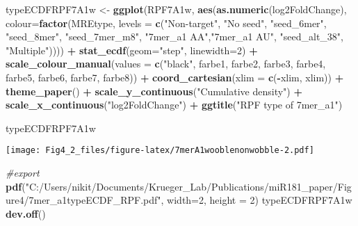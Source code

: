 \documentclass[
]{article}
\newenvironment{Shaded}{\begin{snugshade}}{\end{snugshade}}
\newcommand{\AttributeTok}[1]{\textcolor[rgb]{0.13,0.29,0.53}{#1}}
\newcommand{\CommentTok}[1]{\textcolor[rgb]{0.56,0.35,0.01}{\textit{#1}}}
\newcommand{\DecValTok}[1]{\textcolor[rgb]{0.00,0.00,0.81}{#1}}
\newcommand{\FunctionTok}[1]{\textcolor[rgb]{0.13,0.29,0.53}{\textbf{#1}}}
\newcommand{\NormalTok}[1]{#1}
\newcommand{\OtherTok}[1]{\textcolor[rgb]{0.56,0.35,0.01}{#1}}
\newcommand{\SpecialCharTok}[1]{\textcolor[rgb]{0.81,0.36,0.00}{\textbf{#1}}}
\newcommand{\StringTok}[1]{\textcolor[rgb]{0.31,0.60,0.02}{#1}}
\begin{document}
\begin{Shaded}
\begin{Highlighting}[]
\NormalTok{typeECDFRPF7A1w }\OtherTok{\textless{}{-}} \FunctionTok{ggplot}\NormalTok{(RPF7A1w, }\FunctionTok{aes}\NormalTok{(}\FunctionTok{as.numeric}\NormalTok{(log2FoldChange), }
                              \AttributeTok{colour=}\FunctionTok{factor}\NormalTok{(MREtype, }\AttributeTok{levels =} \FunctionTok{c}\NormalTok{(}\StringTok{"Non{-}target"}\NormalTok{, }\StringTok{"No seed"}\NormalTok{, }\StringTok{"seed\_6mer"}\NormalTok{, }\StringTok{"seed\_8mer"}\NormalTok{, }\StringTok{"seed\_7mer\_m8"}\NormalTok{, }\StringTok{"7mer\_a1 AA"}\NormalTok{,}\StringTok{"7mer\_a1 AU"}\NormalTok{, }\StringTok{"seed\_alt\_38"}\NormalTok{, }\StringTok{"Multiple"}\NormalTok{)))) }\SpecialCharTok{+} 
  \FunctionTok{stat\_ecdf}\NormalTok{(}\AttributeTok{geom=}\StringTok{"step"}\NormalTok{, }\AttributeTok{linewidth=}\DecValTok{2}\NormalTok{) }\SpecialCharTok{+}
  \FunctionTok{scale\_colour\_manual}\NormalTok{(}\AttributeTok{values =} \FunctionTok{c}\NormalTok{(}\StringTok{"black"}\NormalTok{, farbe1, farbe2, farbe3, farbe4, farbe5, farbe6, farbe7, farbe8)) }\SpecialCharTok{+}
  \FunctionTok{coord\_cartesian}\NormalTok{(}\AttributeTok{xlim =} \FunctionTok{c}\NormalTok{(}\SpecialCharTok{{-}}\NormalTok{xlim, xlim)) }\SpecialCharTok{+} 
  \FunctionTok{theme\_paper}\NormalTok{() }\SpecialCharTok{+}
  \FunctionTok{scale\_y\_continuous}\NormalTok{(}\StringTok{"Cumulative density"}\NormalTok{) }\SpecialCharTok{+} \FunctionTok{scale\_x\_continuous}\NormalTok{(}\StringTok{"log2FoldChange"}\NormalTok{) }\SpecialCharTok{+}
  \FunctionTok{ggtitle}\NormalTok{(}\StringTok{"RPF type of 7mer\_a1"}\NormalTok{)}

\NormalTok{typeECDFRPF7A1w}
\end{Highlighting}
\end{Shaded}

\texttt{[image: Fig4\_2\_files/figure-latex/7merA1wooblenonwobble-2.pdf]}

\begin{Shaded}
\begin{Highlighting}[]
\CommentTok{\#export}
\FunctionTok{pdf}\NormalTok{(}\StringTok{"C:/Users/nikit/Documents/Krueger\_Lab/Publications/miR181\_paper/Figure4/7mer\_a1typeECDF\_RPF.pdf"}\NormalTok{, }\AttributeTok{width=}\DecValTok{2}\NormalTok{, }\AttributeTok{height =} \DecValTok{2}\NormalTok{)}
\NormalTok{typeECDFRPF7A1w}
\FunctionTok{dev.off}\NormalTok{()}
\end{Highlighting}
\end{Shaded}
\end{document}
